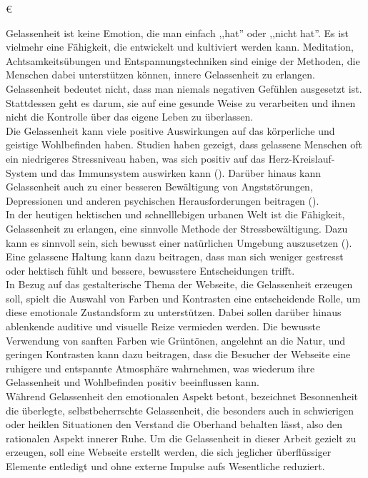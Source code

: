 €\documentclass[./dokumentation.tex]{subfiles}
\begin{document}
Gelassenheit ist keine Emotion, die man einfach ,,hat'' oder ,,nicht hat''. Es ist vielmehr eine Fähigkeit, die entwickelt und kultiviert werden kann. Meditation, Achtsamkeitsübungen und Entspannungstechniken sind einige der Methoden, die Menschen dabei unterstützen können, innere Gelassenheit zu erlangen. Gelassenheit bedeutet nicht, dass man niemals negativen Gefühlen ausgesetzt ist. Stattdessen geht es darum, sie auf eine gesunde Weise zu verarbeiten und ihnen nicht die Kontrolle über das eigene Leben zu überlassen. \\
Die Gelassenheit kann viele positive Auswirkungen auf das körperliche und geistige Wohlbefinden haben. Studien haben gezeigt, dass gelassene Menschen oft ein niedrigeres Stressniveau haben, was sich positiv auf das Herz-Kreislauf-System und das Immunsystem auswirken kann (\cite{chin2021}). Darüber hinaus kann Gelassenheit auch zu einer besseren Bewältigung von Angststörungen, Depressionen und anderen psychischen Herausforderungen beitragen (\cite{monahan1986}). \\
In der heutigen hektischen und schnelllebigen urbanen Welt ist die Fähigkeit, Gelassenheit zu erlangen, eine sinnvolle Methode der Stressbewältigung. Dazu kann es sinnvoll sein, sich bewusst einer natürlichen Umgebung auszusetzen (\cite{vandenbosch2015}). Eine gelassene Haltung kann dazu beitragen, dass man sich weniger gestresst oder hektisch fühlt und bessere, bewusstere Entscheidungen trifft. \\
In Bezug auf das gestalterische Thema der Webseite, die Gelassenheit erzeugen soll, spielt die Auswahl von Farben und Kontrasten eine entscheidende Rolle, um diese emotionale Zustandsform zu unterstützen. Dabei sollen darüber hinaus ablenkende auditive und visuelle Reize vermieden werden. Die bewusste Verwendung von sanften Farben wie Grüntönen, angelehnt an die Natur, und geringen Kontrasten kann dazu beitragen, dass die Besucher der Webseite eine ruhigere und entspannte Atmosphäre wahrnehmen, was wiederum ihre Gelassenheit und Wohlbefinden positiv beeinflussen kann.\\
Während Gelassenheit den emotionalen Aspekt betont, bezeichnet Besonnenheit die überlegte, selbstbeherrschte Gelassenheit, die besonders auch in schwierigen oder heiklen Situationen den Verstand die Oberhand behalten lässt, also den rationalen Aspekt innerer Ruhe.
Um die Gelassenheit in dieser Arbeit gezielt zu erzeugen, soll eine Webseite erstellt werden, die sich jeglicher überflüssiger Elemente entledigt und ohne externe Impulse aufs Wesentliche reduziert.\\
\end{document}
